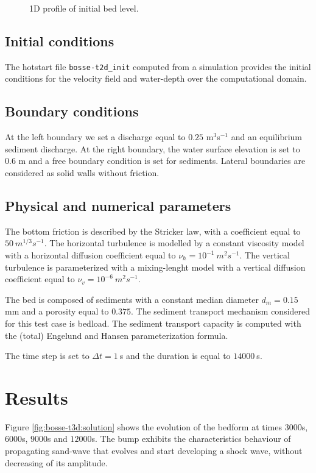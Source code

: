 \begin{figure}[H]
 \centering
 \caption{1D profile of initial bed level.}
 \label{fig:bosse-t3d:bottom}
\end{figure}

\subsection{Initial conditions}
%
The hotstart file \texttt{bosse-t2d\_init} computed from a  simulation provides the initial conditions for the velocity field and water-depth over the computational domain.
%
\subsection{Boundary conditions}
%
At the left boundary we set a discharge equal to $0.25$ m$^3$s$^{-1}$ and an equilibrium sediment discharge. At the right boundary, the water surface elevation is set to $0.6$ m and a free boundary condition is set for sediments. Lateral boundaries are considered as solid walls without friction.
%

%
\subsection{Physical and numerical parameters}
%

The bottom friction is described by the Stricker law, with a coefficient equal to $50~m^{1/3}s^{-1}$. The horizontal turbulence is modelled by a constant viscosity model with a horizontal diffusion coefficient equal to $\nu_h=10^{-1}~m^2s^{-1}$. The vertical turbulence is parameterized with a mixing-lenght model with a vertical diffusion coefficient equal to $\nu_v=10^{-6}~m^2s^{-1}$. 

The bed is composed of sediments with a constant median diameter $d_m=0.15~$ mm and a porosity equal to $0.375$. The sediment transport mechanism considered for this test case is bedload. The sediment transport capacity is computed with the (total) Engelund and Hansen parameterization formula.

The time step is set to $\Delta t=1~$s and the duration is equal to $14000~$s.
%
\section{Results}
Figure \ref{fig:bosse-t3d:solution} shows the evolution of the bedform at times $3000$s, $6000$s, $9000$s and $12000$s. The bump exhibits the characteristics behaviour of propagating sand-wave that evolves and start developing a shock wave, without decreasing of its amplitude.


